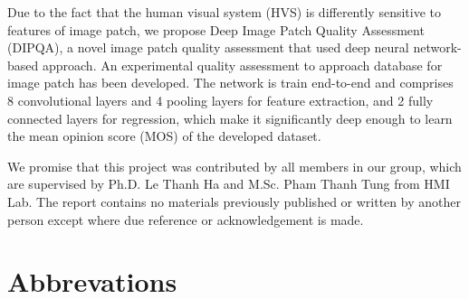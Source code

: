 \documentclass[a4paper, 13pt, oneside]{Thesis}
\begin{document}
Due to the fact that the human visual system (HVS) is differently sensitive to features of image patch, we propose Deep Image Patch Quality Assessment (DIPQA), a novel image patch quality assessment that used deep neural network-based approach. An experimental quality assessment to approach database for image patch has been developed. The network is train end-to-end and comprises 8 convolutional layers and 4 pooling layers for feature extraction, and 2 fully connected layers for regression, which make it significantly deep enough to learn the mean opinion score (MOS) of the developed dataset.

We promise that this project was contributed by all members in our group, which are supervised by Ph.D. Le Thanh Ha and M.Sc. Pham Thanh Tung from HMI Lab. The report contains no materials previously published or written by another person except where due reference or acknowledgement is made.
%
\tableofcontents
\listoffigures
\listoftables

\chapter*{Abbrevations}
%
\newpage\cleardoublepage
\newpage\cleardoublepage
\newpage\cleardoublepage
\newpage\cleardoublepage
\newpage\cleardoublepage

\nocite{*}
\newpage\cleardoublepage

\end{document}
